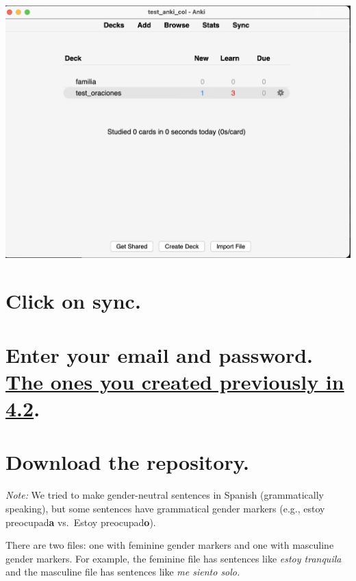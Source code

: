 \documentclass[
]{book}
\begin{document}
\includegraphics[width=1\linewidth]{images/reposit_en/anki_screen}

\hypertarget{click-on-sync.}{%
\section{Click on sync.}\label{click-on-sync.}}

\hypertarget{enter-your-email-and-password.-the-ones-you-created-previously-in-4.2.}{%
\section{\texorpdfstring{Enter your email and password. \protect\hyperlink{cross_3}{The ones you created previously in 4.2}.}{Enter your email and password. The ones you created previously in 4.2.}}\label{enter-your-email-and-password.-the-ones-you-created-previously-in-4.2.}}

\hypertarget{download-the-repository.}{%
\section{Download the repository.}\label{download-the-repository.}}

\emph{Note:} We tried to make gender-neutral sentences in Spanish (grammatically speaking), but some sentences have grammatical gender markers (e.g., estoy preocupad\textbf{a} vs.~Estoy preocupad\textbf{o}).

There are two files: one with feminine gender markers and one with masculine gender markers. For example, the feminine file has sentences like \emph{estoy tranquila} and the masculine file has sentences like \emph{me siento solo.}
\end{document}
